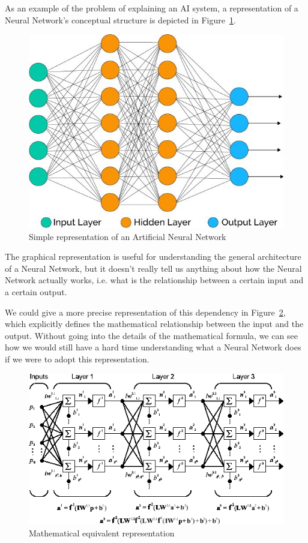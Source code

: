 \documentclass[conference]{IEEEtran}
\begin{document}
As an example of the problem of explaining an AI system, a representation of a
Neural Network's conceptual structure is depicted in Figure~\ref{fig:nn}.

\begin{figure}[ht!] \centering \includegraphics[width=0.8 \linewidth]{images/nn}
    \caption{Simple representation of an Artificial Neural Network}
    \label{fig:nn} \end{figure}

The graphical representation is useful for understanding the general
architecture of a Neural Network, but it doesn't really tell us anything about
how the Neural Network actually works, i.e. what is the relationship between a
certain input and a certain output.

We could give a more precise representation of this dependency in
Figure~\ref{fig:mathnn}, which explicitly defines the mathematical relationship
between the input and the output. Without going into the details of the
mathematical formula, we can see how we would still have a hard time
understanding what a Neural Network does if we were to adopt this
representation.

\begin{figure}[ht!] \centering
    \includegraphics[width=0.9\linewidth]{images/nmodel} \caption{Mathematical
        equivalent representation} \label{fig:mathnn} \end{figure}
\end{document}
